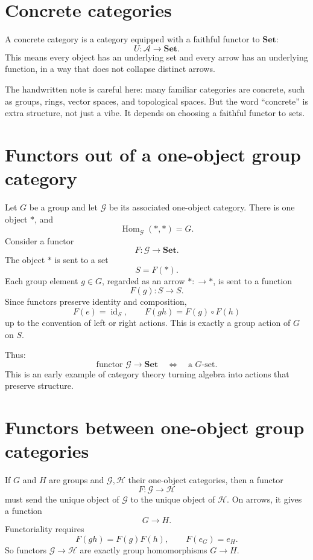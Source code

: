 \section{Concrete categories}

A concrete category is a category equipped with a faithful functor to $\mathbf{Set}$:
\[
  U:\mathcal A\to\mathbf{Set}.
\]
This means every object has an underlying set and every arrow has an underlying function, in a way that does not collapse distinct arrows.

The handwritten note is careful here: many familiar categories are concrete, such as groups, rings, vector spaces, and topological spaces.  But the word “concrete” is extra structure, not just a vibe.  It depends on choosing a faithful functor to sets.

\section{Functors out of a one-object group category}

Let $G$ be a group and let $\mathcal G$ be its associated one-object category.  There is one object $*$, and
\[
  \operatorname{Hom}_{\mathcal G}(*,*)=G.
\]
Consider a functor
\[
  F:\mathcal G\to\mathbf{Set}.
\]
The object $*$ is sent to a set
\[
  S=F(*).
\]
Each group element $g\in G$, regarded as an arrow $*:\to*$, is sent to a function
\[
  F(g):S\to S.
\]
Since functors preserve identity and composition,
\[
  F(e)=\operatorname{id}_S,\qquad
  F(gh)=F(g)\circ F(h)
\]
up to the convention of left or right actions.  This is exactly a group action of $G$ on $S$.

Thus:
\[
  \text{functor }\mathcal G\to\mathbf{Set}
  \quad\Longleftrightarrow\quad
  \text{a }G\text{-set}.
\]
This is an early example of category theory turning algebra into actions that preserve structure.

\section{Functors between one-object group categories}

If $G$ and $H$ are groups and $\mathcal G,\mathcal H$ their one-object categories, then a functor
\[
  F:\mathcal G\to\mathcal H
\]
must send the unique object of $\mathcal G$ to the unique object of $\mathcal H$.  On arrows, it gives a function
\[
  G\to H.
\]
Functoriality requires
\[
  F(gh)=F(g)F(h),\qquad F(e_G)=e_H.
\]
So functors $\mathcal G\to\mathcal H$ are exactly group homomorphisms $G\to H$.

